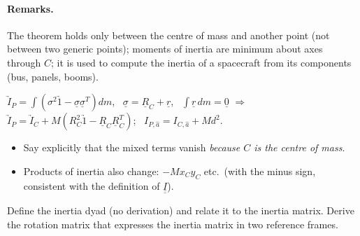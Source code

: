\paragraph{Remarks.} The theorem holds only between the centre of mass and another point (not between two generic points); moments of
inertia are minimum about axes through $C$; it is used to compute the inertia of a spacecraft from its components (bus, panels, booms).

\begin{keyf}
$\underrightarrow I_P=\int(\sigma^2\underrightarrow1-\underline\sigma\underline\sigma^T)dm$, \ $\underline\sigma=\underline R_C+\underline r$, \ $\int\underline r\,dm=\underline 0$ $\Rightarrow$
$\underrightarrow I_P=\underrightarrow I_C+M(R_C^2\underrightarrow1-\underline R_C\underline R_C^T)$; \ $I_{P,\hat a}=I_{C,\hat a}+Md^2$.
\end{keyf}

\pitfalls
\begin{itemize}
\item Say explicitly that the mixed terms vanish \emph{because $C$ is the centre of mass}.
\item Products of inertia also change: $-Mx_Cy_C$ etc.\ (with the minus sign, consistent with the definition of $\underline{\underline I}$).
\end{itemize}


\begin{qbox}
Define the inertia dyad (no derivation) and relate it to the inertia matrix. Derive the rotation matrix that expresses the inertia
matrix in two reference frames.
\end{qbox}

